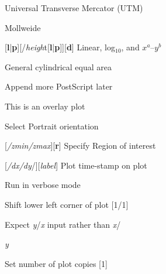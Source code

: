 \documentclass{article}
\begin{document}
\par 	{}	Universal Transverse Mercator (UTM)\par 

\par 	{}	Mollweide\par 

\par 	{}[{\bf l}|{\bf p}][/{\it heigh}t[{\bf l}|{\bf p}]][{\bf d}]	Linear, log$_{10}$, and $x^a$--$y^b$\par 

\par 	{}	General cylindrical equal area\par 

\par {}	Append more PostScript later\par 

\par {}	This is an overlay plot\par 

\par {}	Select Portrait orientation\par 

\par {}[{\it /zmin/zmax}][{\bf r}]	Specify Region of interest\par 

\par {}[{\it /dx/dy}/][{\it label}]	Plot time-stamp on plot\par 

\par {}	Run in verbose mode\par 

\par {} 	Shift lower left corner of plot [1/1]\par 

\par \Opt{:}	Expect {\it y}/{\it x} input rather than {\it x}/{\it y\par 

}\par {}	Set number of plot copies [1]\par 
\end{document}
